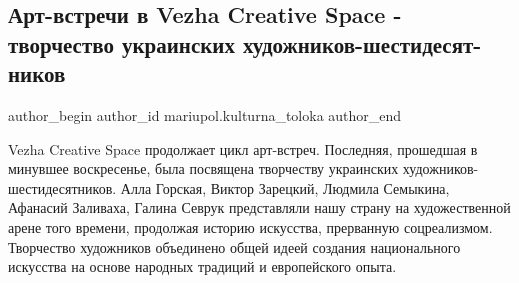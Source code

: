  
 
 
 
 

\subsection{Арт-встречи в Vezha Creative Space - творчество украинских художников-шестидесят\hyp{}ников}
\label{sec:07_02_2019.fb.mariupol.kulturna_toloka.1.art_vstrechi_vezha_creative_space_hudozhniki_60x}

\ifcmt
 author_begin
   author_id mariupol.kulturna_toloka
 author_end
\fi

Vezha Creative Space продолжает цикл арт-встреч. Последняя, прошедшая в
минувшее воскресенье, была посвящена творчеству украинских
художников-шестидесятников. Алла Горская, Виктор Зарецкий, Людмила Семыкина,
Афанасий Заливаха, Галина Севрук представляли нашу страну на художественной
арене того времени, продолжая историю искусства, прерванную соцреализмом.
Творчество художников объединено общей идеей создания национального искусства
на основе народных традиций и европейского опыта.

